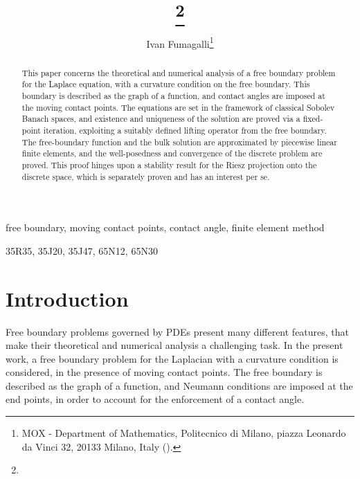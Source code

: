 \documentclass[final,hidelinks]{siamart1116Arxiv}
\title{{\TheTitle}\thanks{\funding{This work was supported by Moxoff s.p.a. (\url{www.moxoff.com})}}}
\author{
  Ivan Fumagalli\thanks{MOX - Department of Mathematics, Politecnico di Milano, piazza Leonardo da Vinci 32, 20133 Milano, Italy
    (\email{ivan.fumagalli@polimi.it}).}
}
\numberwithin{theorem}{section}
\begin{document}
\maketitle

\begin{abstract}
 This paper concerns the theoretical and numerical analysis of a free boundary problem for the Laplace equation, with a curvature condition on the free boundary.
 This boundary is described as the graph of a function, and contact angles are imposed at the moving contact points.
 The equations are set in the framework of classical Sobolev Banach spaces, and existence and uniqueness of the solution are proved via a fixed-point iteration, exploiting a suitably defined lifting operator from the free boundary.
 The free-boundary function and the bulk solution are approximated by piecewise linear finite elements, and the well-posedness and convergence of the discrete problem are proved.
 This proof hinges upon a stability result for the Riesz projection onto the discrete space, which is separately proven and has an interest per se.
\end{abstract}

\begin{keywords}
  free boundary, moving contact points, contact angle, finite element method
\end{keywords}

\begin{AMS}
  35R35, 35J20, 35J47, 65N12, 65N30
\end{AMS}

\section*{Introduction}
\label{sec:intro}

Free boundary problems governed by PDEs present many different features, that make their theoretical and numerical analysis a challenging task.
In the present work, a free boundary problem for the Laplacian with a curvature condition is considered, in the presence of moving contact points.
The free boundary is described as the graph of a function, and Neumann conditions are imposed at the end points, in order to account for the enforcement of a contact angle.
\end{document}
